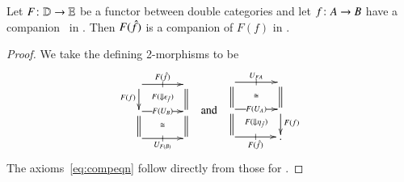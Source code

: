 \begin{lem}\label{thm:comp-func}
  Let $F\colon \mathbb{D}\to\mathbb{E}$ be a functor between double categories and
  let $f\colon A\to B$ have a companion \fhat\ in \lD.  Then $F(\hat{f})$
  is a companion of $F(f)$ in \lE.
\end{lem}
\begin{proof}
  We take the defining 2-morphisms to be
  \[\vcenter{\xymatrix@R=1.5pc@C=3pc{
      \ar[r]|-@{|}^-{F(\fhat)} \ar[d]_{F(f)}
      \ar@{}[dr]|{F(\Downarrow \epsilon_{\hat{f}})} &  \ar@{=}[d]\\
      \ar[r]|-{F(U_B)} \ar@{=}[d] \ar@{}[dr]|\iso &  \ar@{=}[d]\\
      \ar[r]|-@{|}_-{U_{F(B)}} & }}
  \quad\text{and}\quad
  \vcenter{\xymatrix@R=1.5pc@C=3pc{
      \ar[r]|-@{|}^-{U_{FA}} \ar@{=}[d] \ar@{}[dr]|\iso & \ar@{=}[d]\\
      \ar[r]|-{F(U_{A})} \ar@{=}[d] \ar@{}[dr]|{F(\Downarrow \eta_{\hat{f}})} & 
      \ar[d]^{F(f)}\\
      \ar[r]|-@{|}_-{F(\fhat)} & .}}\]
  The axioms~\eqref{eq:compeqn} follow directly from those for \fhat.
\end{proof}


